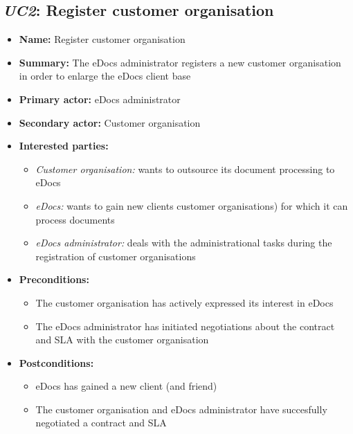 \documentclass[a4paper,10pt]{article}
\begin{document}
\subsection{\emph{UC2}: Register customer organisation}
\begin{itemize}
    \item \textbf{Name:} Register customer organisation
    \item \textbf{Summary:} The eDocs administrator registers a new customer organisation in order to enlarge the eDocs client base
    \item \textbf{Primary actor:} eDocs administrator
    \item \textbf{Secondary actor:} Customer organisation
    \item \textbf{Interested parties:} 
        \begin{itemize}
            \item \textit{Customer organisation:} wants to outsource its document processing to eDocs
            \item \textit{eDocs:} wants to gain new clients  customer organisations) for which it can process documents
            \item \textit{eDocs administrator:} deals with the administrational tasks during the registration of customer organisations
        \end{itemize}
    \item \textbf{Preconditions:}
        \begin{itemize}
            \item The customer organisation has actively expressed its interest in eDocs
            \item The eDocs administrator has initiated negotiations about the contract and SLA with the customer organisation
        \end{itemize}
    \item \textbf{Postconditions:}
        \begin{itemize}
            \item eDocs has gained a new client (and friend)
            \item The customer organisation and eDocs administrator have succesfully negotiated a contract and SLA
        \end{itemize}
        

\end{itemize}
\end{document}
